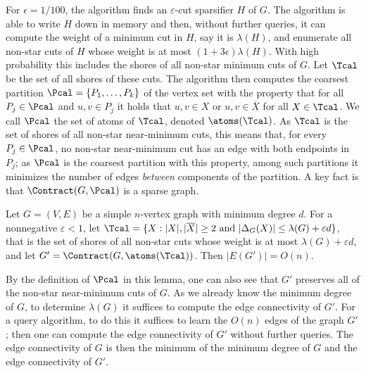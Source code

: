 For $\epsilon = 1/100$, the algorithm finds an $\varepsilon$-cut sparsifier $H$ of $G$.  The algorithm is able to write $H$ down in memory and then, without further queries, it can compute the weight of a minimum cut in $H$, say it is $\lambda(H)$, and enumerate all non-star cuts of $H$ whose weight is at most $(1+ 3 \epsilon) \lambda(H)$.  
With high probability this includes the shores of all non-star minimum cuts of $G$.  Let $\Tcal$ be the set of all shores of these cuts.  
The algorithm then computes the coarsest partition $\Pcal = \{P_1, \ldots, P_k\}$ of the vertex set with the property that for all $P_j \in \Pcal$ and $u,v \in P_j$ it holds 
that $u,v \in X$ or $u,v \in \overline{X}$ for all $X \in \Tcal$.  We call $\Pcal$ the set of atoms of $\Tcal$, denoted $\atoms(\Tcal)$. 
As $\Tcal$ is the set of shores of all non-star near-minimum cuts, this means that, for every $P_j \in \Pcal$, no non-star near-minimum cut has an edge with both endpoints in $P_j$;  
as $\Pcal$ is the coarsest partition with this property, among such partitions it minimizes the number of edges \emph{between} components of the partition.  A key 
fact is that $\Contract(G,\Pcal)$ is a sparse graph.

\begin{lemma}
\label{lem:RSW}
Let $G = (V,E)$ be a simple $n$-vertex graph with minimum degree $d$.  For a nonnegative $\varepsilon < 1$, let 
$\Tcal = \{X : |X|, |\overline{X}| \ge 2 \mbox{ and } |\Delta_G(X)| \le \lambda(G) + \varepsilon d\}$, that is the set of shores of all non-star cuts whose weight is at most $\lambda(G) + \varepsilon d$, and let $G' = \Contract(G, \atoms(\Tcal))$.  Then 
$|E(G')| = O(n)$.
\end{lemma}
By the definition of $\Pcal$ in this lemma, one can also see that $G'$
preserves all of the non-star near-minimum cuts of $G$.  As we already know the minimum degree of $G$, to determine $\lambda(G)$ it suffices to compute 
the edge connectivity of $G'$.  For a query algorithm, to do this it suffices to learn the $O(n)$ edges of the graph $G'$; 
then one can compute the edge connectivity of $G'$ without further queries.  The edge connectivity of $G$ is then the minimum of the minimum degree of $G$ and the 
edge connectivity of $G'$.  

